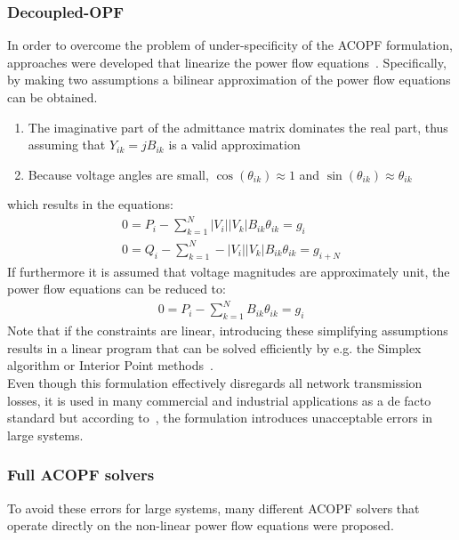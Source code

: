 \documentclass[11pt]{cmuthesis} %
\begin{document}
\subsubsection{Decoupled-OPF}
In order to overcome the problem of under-specificity of the ACOPF formulation, approaches were developed that linearize the power flow equations~\cite{stott1974fast}. Specifically, by making two assumptions a bilinear approximation of the power flow equations can be obtained.
\begin{enumerate}
\item The imaginative part of the admittance matrix dominates the real part, thus assuming that $Y_{ik} = jB_{ik}$ is a valid approximation
\item Because voltage angles are small, $\cos(\theta_{ik}) \approx 1$ and $\sin(\theta_{ik}) \approx \theta_{ik}$
\end{enumerate}
which results in the equations:
\begin{align*}
0 = P_i - \sum_{k=1}^N |V_i||V_k| B_{ik} \theta_{ik} = g_i\\
0 = Q_i - \sum_{k=1}^N -|V_i||V_k| B_{ik} \theta_{ik} = g_{i+N}
\end{align*}
If furthermore it is assumed that voltage magnitudes are approximately unit, the power flow equations can be reduced to:
\begin{align*}
0 = P_i - \sum_{k=1}^N B_{ik} \theta_{ik} = g_i
\end{align*}
 Note that if the constraints are linear, introducing these simplifying assumptions results in a linear program that can be solved efficiently by e.g. the Simplex algorithm or Interior Point methods~\cite{klee1970good}.\\
Even though this formulation effectively disregards all network transmission losses, it is used in many commercial and industrial applications as a de facto standard but according to~\cite{stott2009dc}, the formulation introduces unacceptable errors in large systems.

\subsubsection{Full ACOPF solvers}
To avoid these errors for large systems, many different ACOPF solvers that operate directly on the non-linear power flow equations were proposed.
\end{document}
